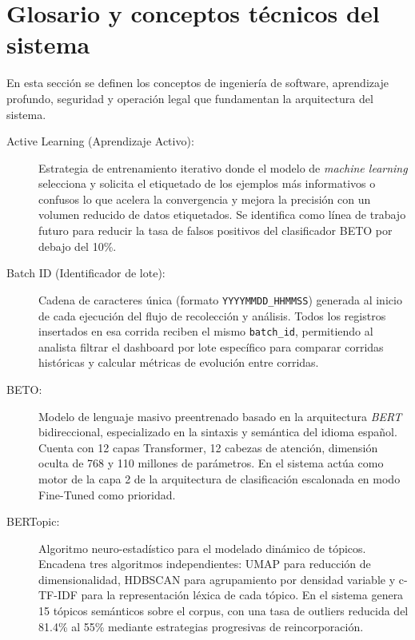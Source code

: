 
\section{Glosario y conceptos técnicos del sistema}
\label{sec:terminosDeNegocio}

En esta sección se definen los conceptos de ingeniería de software, aprendizaje profundo,
seguridad y operación legal que fundamentan la arquitectura del sistema.

\begin{description}

    \item[\hypertarget{tActiveLearning}{Active Learning (Aprendizaje Activo):}]
    Estrategia de entrenamiento iterativo donde el modelo de \textit{machine learning}
    selecciona y solicita el etiquetado de los ejemplos más informativos o confusos
    lo que acelera la convergencia y mejora la precisión con un volumen reducido de
    datos etiquetados. Se identifica como línea de trabajo futuro para reducir la tasa
    de falsos positivos del clasificador BETO por debajo del 10\%.

    \item[\hypertarget{tBatchID}{Batch ID (Identificador de lote):}]
    Cadena de caracteres única (formato \texttt{YYYYMMDD\_HHMMSS}) generada al inicio
    de cada ejecución del flujo de recolección y análisis. Todos los registros
    insertados en esa corrida reciben el mismo \texttt{batch\_id}, permitiendo al
    analista filtrar el dashboard por lote específico para comparar corridas históricas
    y calcular métricas de evolución entre corridas.

    \item[\hypertarget{tBETO}{BETO:}]
    Modelo de lenguaje masivo preentrenado basado en la arquitectura
    \textit{BERT} bidireccional, especializado en la sintaxis y semántica del
    idioma español. Cuenta con 12 capas Transformer, 12 cabezas de atención,
    dimensión oculta de 768 y 110 millones de parámetros. En el sistema actúa
    como motor de la capa 2 de la arquitectura de clasificación escalonada
    en modo Fine-Tuned como prioridad.

    \item[\hypertarget{tBERTopic}{BERTopic:}]
    Algoritmo neuro-estadístico para el modelado dinámico de tópicos. Encadena
    tres algoritmos independientes: UMAP para reducción de dimensionalidad,
    HDBSCAN para agrupamiento por densidad variable y c-TF-IDF para la
    representación léxica de cada tópico. En el sistema genera 15 tópicos
    semánticos sobre el corpus, con una tasa de outliers reducida del 81.4\%
    al 55\% mediante estrategias progresivas de reincorporación.


\end{description}
